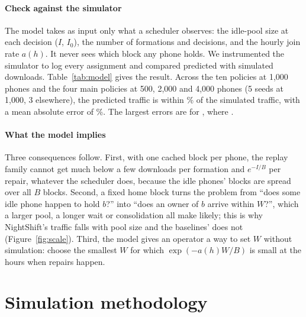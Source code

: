 \documentclass[preprint,review,12pt,authoryear]{elsarticle}
\begin{document}
\paragraph{Check against the simulator} The model takes as input only what a
scheduler observes: the idle-pool size at each decision ($I$, $I_0$), the number
of formations and decisions, and the hourly join rate $a(h)$. It never sees
which block any phone holds. We instrumented the simulator to log every
assignment and compared predicted with simulated downloads.
Table~\ref{tab:model} gives the result. Across the ten policies at 1,000 phones
and the four main policies at 500, 2,000 and 4,000 phones (5 seeds at 1,000,
3 elsewhere), the predicted traffic is within \TMErrAbsMaxPct\% of the
simulated traffic, with a mean absolute error of \TMErrAbsMeanPct\%. The
largest errors are for \TMErrWorstKey, where \TMErrWorstWhy.



\paragraph{What the model implies} Three consequences follow. First, with one
cached block per phone, the replay family cannot get much below a few downloads per
formation and $e^{-I/B}$ per repair, whatever the scheduler does, because the
idle phones' blocks are spread over all $B$ blocks. Second, a fixed home block
turns the problem from ``does some idle phone happen to hold $b$?'' into ``does
an owner of $b$ arrive within $W$?'', which a larger pool, a longer wait or
consolidation all make likely; this is why NightShift's traffic falls with
pool size and the baselines' does not (Figure~\ref{fig:scale}). Third, the
model gives an operator a way to set $W$ without simulation: choose the
smallest $W$ for which $\exp(-a(h) W / B)$ is small at the hours when repairs
happen.

\section{Simulation methodology}
\label{sec:method}
\end{document}
